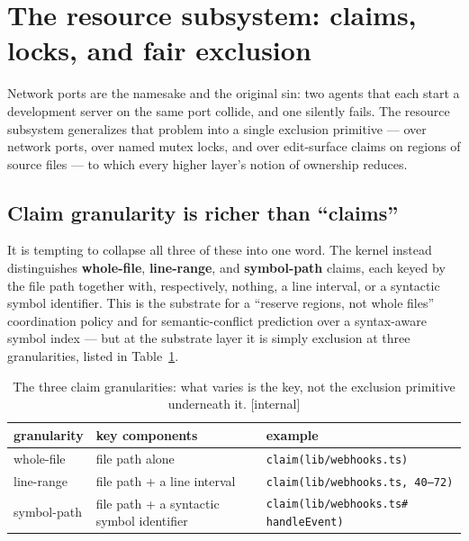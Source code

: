 \documentclass[11pt,a4paper]{article}
\theoremstyle{definition}
\theoremstyle{remark}
\begin{document}
\section{The resource subsystem: claims, locks, and fair exclusion}
\label{sec:resource}
Network ports are the namesake and the original sin: two agents that each start a
development server on the same port collide, and one silently fails. The resource
subsystem generalizes that problem into a single exclusion primitive --- over network
ports, over named mutex locks, and over edit-surface claims on regions of source
files --- to which every higher layer's notion of ownership reduces.
\subsection{Claim granularity is richer than ``claims''}
It is tempting to collapse all three of these into one word. The kernel instead
distinguishes \textbf{whole-file}, \textbf{line-range}, and \textbf{symbol-path}
claims, each keyed by the file path together with, respectively, nothing, a
line interval, or a syntactic symbol identifier. This is the substrate for a
``reserve regions, not whole files'' coordination policy and for semantic-conflict
prediction over a syntax-aware symbol index --- but at the substrate layer it is
simply exclusion at three granularities, listed in Table~\ref{tab:swk-claim-granularity}.
\begin{table}[H]
\centering
\caption{The three claim granularities: what varies is the key, not the
exclusion primitive underneath it. [internal]}
\label{tab:swk-claim-granularity}
\small
\renewcommand{\arraystretch}{1.2}
\begin{tabularx}{\textwidth}{@{}>{\raggedright\arraybackslash}p{} >{\raggedright\arraybackslash}X >{\raggedright\arraybackslash}X@{}}
\toprule
\textbf{granularity} & \textbf{key components} & \textbf{example} \\
\midrule
whole-file & file path alone & \texttt{claim(lib/webhooks.ts)} \\
line-range & file path + a line interval & \texttt{claim(lib/webhooks.ts, 40--72)} \\
symbol-path & file path + a syntactic symbol identifier & \texttt{claim(lib/webhooks.ts\#} \newline \texttt{handleEvent)} \\
\bottomrule
\end{tabularx}
\end{table}
\end{document}
